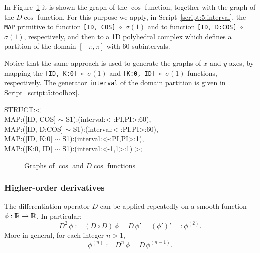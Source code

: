 \documentclass{31x47jw}
\begin{document}
\begin{example}
    
In Figure~\ref{figure:5:ex1} it is shown the graph of the $\cos$
function, together with the graph of the $D\cos$ function.  For this
purpose we apply, in Script~\ref{script:5:interval}, the \texttt{MAP}
primitive to function \texttt{[ID, COS] $\circ$ $\sigma(1)$} and to
function \texttt{[ID, D:COS] $\circ$ $\sigma(1)$}, respectively, and
then to a 1D polyhedral complex which defines a partition of the
domain $[-\pi,\pi]$ with 60 subintervals.

Notice that the same approach is used to generate the graphs of $x$
and $y$ axes, by mapping the \texttt{[ID, K:0] $\circ$ $\sigma(1)$}
and \texttt{[K:0, ID] $\circ$ $\sigma(1)$} functions, respectively. 
The generator \texttt{interval} of the domain partition is given in
Script~\ref{script:5:toolbox}.
    
\begin{script}
\begin{smallplasm}
STRUCT:< \+\\
  MAP:([ID, COS] $\sim$ S1):(interval:<-:PI,PI>:60),\\
  MAP:([ID, D:COS] $\sim$ S1):(interval:<-:PI,PI>:60),\\
  MAP:([ID, K:0] $\sim$ S1):(interval:<-:PI,PI>:1),\\
  MAP:([K:0, ID] $\sim$ S1):(interval:<-1,1>:1) >;
\end{smallplasm}
\label{script:5:interval}
\end{script}


\begin{figure}[htb]
\centering{}
\caption{Graphs of $\cos$ and $D\cos$ functions
\label{figure:5:ex1}}
\end{figure}

    
\end{example}



\subsubsection{Higher-order derivatives}

The differentiation operator $D$ can be applied repeatedly on a
{smooth} function $\phi:\mathbb{I\!\!R}\rightarrow\mathbb{I\!\!R}$.  In particular:
\[
D^{2}\, \phi := 
(D \circ D)\, \phi = D\, 
{\phi}' = (\phi')' =: \phi^{(2)}.
\]
More in general, for each integer $n>1$,  
\[
\phi^{(n)} := D^{n}\, \phi = D\, \phi^{(n-1)}.
\]
\end{document}
